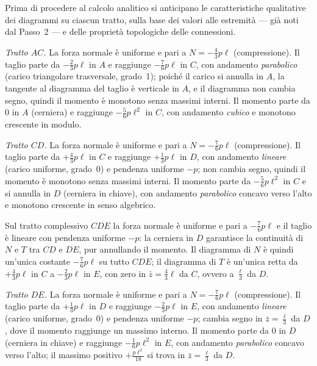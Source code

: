 Prima di procedere al calcolo analitico si anticipano
le caratteristiche qualitative dei diagrammi su ciascun
tratto, sulla base dei valori alle estremità --- già noti
dal Passo~2 --- e delle proprietà topologiche delle
connessioni.

\medskip
\noindent\textit{Tratto $AC$.}
La forza normale è uniforme e pari a
$N = -\tfrac{4}{3}p\ell$ (compressione).
Il taglio parte da $-\tfrac{2}{3}p\ell$ in $A$
e raggiunge $-\tfrac{7}{6}p\ell$ in $C$,
con andamento \emph{parabolico} (carico triangolare
trasversale, grado~1); poiché il carico si annulla
in $A$, la tangente al diagramma del taglio è
verticale in $A$, e il diagramma non cambia segno,
quindi il momento è monotono senza massimi interni.
Il momento parte da $0$ in $A$ (cerniera) e raggiunge
$-\tfrac{5}{6}p\ell^2$ in $C$,
con andamento \emph{cubico} e monotono crescente
in modulo.

\medskip
\noindent\textit{Tratto $CD$.}
La forza normale è uniforme e pari a
$N = -\tfrac{7}{6}p\ell$ (compressione).
Il taglio parte da $+\tfrac{4}{3}p\ell$ in $C$
e raggiunge $+\tfrac{1}{3}p\ell$ in $D$,
con andamento \emph{lineare} (carico uniforme, grado~0)
e pendenza uniforme $-p$; non cambia segno,
quindi il momento è monotono senza massimi interni.
Il momento parte da $-\tfrac{5}{6}p\ell^2$ in $C$
e si annulla in $D$ (cerniera in chiave),
con andamento \emph{parabolico} concavo verso l'alto
e monotono crescente in senso algebrico.

\begin{oss}
	Sul tratto complessivo $CDE$ la forza normale
	è uniforme e pari a $-\tfrac{7}{6}p\ell$
	e il taglio è lineare con pendenza uniforme $-p$:
	la cerniera in $D$ garantisce la continuità
	di $N$ e $T$ tra $CD$ e $DE$, pur annullando
	il momento. Il diagramma di $N$ è quindi
	un'unica costante $-\tfrac{7}{6}p\ell$ su tutto
	$CDE$; il diagramma di $T$ è un'unica retta
	da $+\tfrac{4}{3}p\ell$ in $C$
	a $-\tfrac{2}{3}p\ell$ in $E$, con zero in
	$\bar{z} = \tfrac{4}{3}\ell$ da $C$, ovvero a
	$\tfrac{\ell}{3}$ da $D$.
\end{oss}

\medskip
\noindent\textit{Tratto $DE$.}
La forza normale è uniforme e pari a
$N = -\tfrac{7}{6}p\ell$ (compressione).
Il taglio parte da $+\tfrac{1}{3}p\ell$ in $D$
e raggiunge $-\tfrac{2}{3}p\ell$ in $E$,
con andamento \emph{lineare} (carico uniforme, grado~0)
e pendenza uniforme $-p$; cambia segno in
$\bar{z} = \tfrac{\ell}{3}$ da $D$,
dove il momento raggiunge un massimo interno.
Il momento parte da $0$ in $D$ (cerniera in chiave)
e raggiunge $-\tfrac{1}{6}p\ell^2$ in $E$,
con andamento \emph{parabolico} concavo verso l'alto;
il massimo positivo $+\tfrac{p\ell^2}{18}$ si trova
in $\bar{z} = \tfrac{\ell}{3}$ da $D$.

